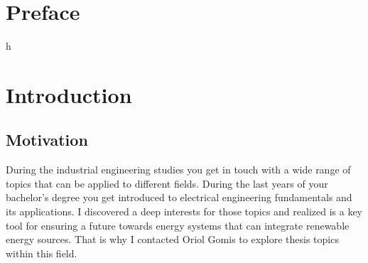 \documentclass[a4paper,11pt, titlepage, twoside]{article}
\begin{document}





\printnomenclature


\listoffigures

\listoftables




\section{Preface}
h


\section{Introduction}\label{Introduction}

\subsection{Motivation}

During the industrial engineering studies you get in touch with a wide range of topics that can be applied
to different fields. During the last years of your bachelor's degree you get introduced to electrical engineering fundamentals and its 
applications. I discovered a deep interests for those topics and realized is a key tool for ensuring a future towards
energy systems that can integrate renewable energy sources. That is why I 
contacted Oriol Gomis to explore thesis topics within this field.\par
\end{document}
